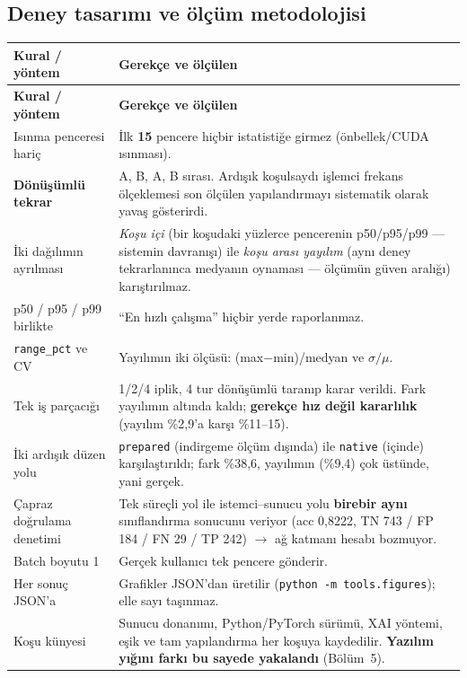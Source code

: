 \documentclass[11pt,a4paper]{article}
\newcommand{\kod}[1]{\texttt{\small #1}}
\begin{document}
\subsection{Deney tasarımı ve ölçüm metodolojisi}

\begin{longtable}{@{}p{4.0cm}p{11.5cm}@{}}
\toprule
\textbf{Kural / yöntem} & \textbf{Gerekçe ve ölçülen} \\
\midrule
\endfirsthead
\toprule
\textbf{Kural / yöntem} & \textbf{Gerekçe ve ölçülen} \\
\midrule
\endhead
Isınma penceresi hariç & İlk \textbf{15} pencere hiçbir istatistiğe girmez
(önbellek/CUDA ısınması). \\
\addlinespace
\textbf{Dönüşümlü tekrar} & A, B, A, B sırası. Ardışık koşulsaydı işlemci
frekans ölçeklemesi son ölçülen yapılandırmayı sistematik olarak yavaş
gösterirdi. \\
\addlinespace
İki dağılımın ayrılması & \emph{Koşu içi} (bir koşudaki yüzlerce pencerenin
p50/p95/p99 --- sistemin davranışı) ile \emph{koşu arası yayılım} (aynı deney
tekrarlanınca medyanın oynaması --- ölçümün güven aralığı) karıştırılmaz. \\
\addlinespace
p50 / p95 / p99 birlikte & ``En hızlı çalışma'' hiçbir yerde raporlanmaz. \\
\addlinespace
\kod{range\_pct} ve CV & Yayılımın iki ölçüsü: (max$-$min)/medyan ve
$\sigma/\mu$. \\
\addlinespace
Tek iş parçacığı & 1/2/4 iplik, 4 tur dönüşümlü taranıp karar verildi. Fark
yayılımın altında kaldı; \textbf{gerekçe hız değil kararlılık}
(yayılım \%2{,}9'a karşı \%11--15). \\
\addlinespace
İki ardışık düzen yolu & \kod{prepared} (indirgeme ölçüm dışında) ile
\kod{native} (içinde) karşılaştırıldı; fark \%38{,}6, yayılımın (\%9{,}4) çok
üstünde, yani gerçek. \\
\addlinespace
Çapraz doğrulama denetimi & Tek süreçli yol ile istemci--sunucu yolu
\textbf{birebir aynı} sınıflandırma sonucunu veriyor (acc 0{,}8222,
TN 743 / FP 184 / FN 29 / TP 242) $\rightarrow$ ağ katmanı hesabı bozmuyor. \\
\addlinespace
Batch boyutu 1 & Gerçek kullanıcı tek pencere gönderir. \\
\addlinespace
Her sonuç JSON'a & Grafikler JSON'dan üretilir
(\kod{python -m tools.figures}); elle sayı taşınmaz. \\
\addlinespace
Koşu künyesi & Sunucu donanımı, Python/PyTorch sürümü, XAI yöntemi, eşik ve
tam yapılandırma her koşuya kaydedilir. \textbf{Yazılım yığını farkı bu sayede
yakalandı} (Bölüm~5). \\
\bottomrule
\end{longtable}
\end{document}
